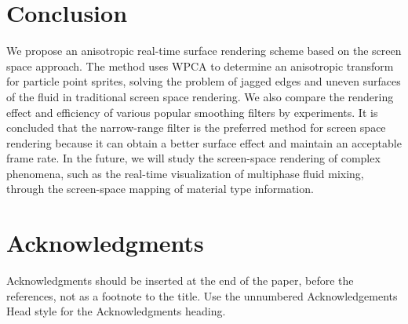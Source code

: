 \documentclass[times,twocolumn,final]{elsarticle}
\begin{document}
\section{Conclusion}
We propose an anisotropic real-time surface rendering scheme based on the screen space approach. The method uses WPCA to determine an anisotropic transform for particle point sprites, solving the problem of jagged edges and uneven surfaces of the fluid in traditional screen space rendering. We also compare the rendering effect and efficiency of various popular smoothing filters by experiments. It is concluded that the narrow-range filter is the preferred method for screen space rendering because it can obtain a better surface effect and maintain an acceptable frame rate. In the future, we will study the screen-space rendering of complex phenomena, such as the real-time visualization of multiphase fluid mixing, through the screen-space mapping of material type information.


\section*{Acknowledgments}
Acknowledgments should be inserted at the end of the paper, before the
references, not as a footnote to the title. Use the unnumbered
Acknowledgements Head style for the Acknowledgments heading.






\end{document}
